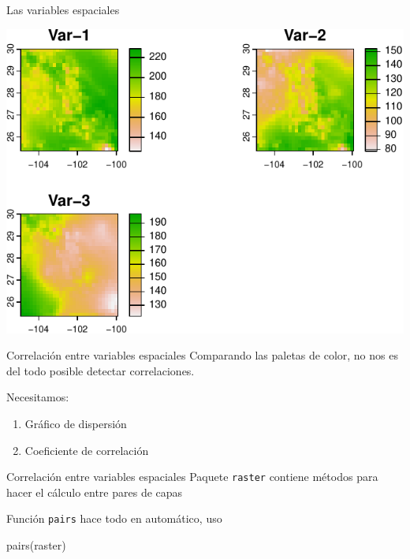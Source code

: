 \documentclass[
  11pt,
  ignorenonframetext,
]{beamer}
\newenvironment{Shaded}{}{}
\newcommand{\FunctionTok}[1]{\textcolor[rgb]{0.02,0.16,0.49}{#1}}
\newcommand{\NormalTok}[1]{#1}
\begin{document}
\begin{frame}{Las variables espaciales}
\protect\hypertarget{las-variables-espaciales-2}{}
\begin{center}\includegraphics{Correlacion-espacial_files/figure-beamer/unnamed-chunk-3-1} \end{center}
\end{frame}

\begin{frame}{Correlación entre variables espaciales}
\protect\hypertarget{correlaciuxf3n-entre-variables-espaciales}{}
Comparando las paletas de color, no nos es del todo posible detectar
correlaciones.

Necesitamos:

\begin{enumerate}
\item
  Gráfico de dispersión
\item
  Coeficiente de correlación
\end{enumerate}
\end{frame}

\begin{frame}[fragile]{Correlación entre variables espaciales}
\protect\hypertarget{correlaciuxf3n-entre-variables-espaciales-1}{}
Paquete \texttt{raster} contiene métodos para hacer el cálculo entre
pares de capas

Función \texttt{pairs} hace todo en automático, uso

\begin{Shaded}
\begin{Highlighting}[]
\FunctionTok{pairs}\NormalTok{(raster)}
\end{Highlighting}
\end{Shaded}
\end{frame}
\end{document}
